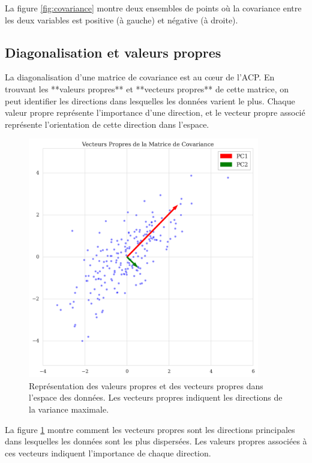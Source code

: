 \documentclass[a4paper,12pt]{report}
\begin{document}
La figure \ref{fig:covariance} montre deux ensembles de points où la covariance entre les deux variables est positive (à gauche) et négative (à droite).

\subsection{Diagonalisation et valeurs propres}

La diagonalisation d'une matrice de covariance est au cœur de l'ACP. En trouvant les **valeurs propres** et **vecteurs propres** de cette matrice, on peut identifier les directions dans lesquelles les données varient le plus. Chaque valeur propre représente l'importance d'une direction, et le vecteur propre associé représente l'orientation de cette direction dans l'espace.

\begin{figure}[H]
    \centering
    \includegraphics[width=0.9\textwidth]{eigenvec.png}
    \caption{Représentation des valeurs propres et des vecteurs propres dans l'espace des données. Les vecteurs propres indiquent les directions de la variance maximale.}
    \label{fig:valeurs_propres}
\end{figure}

La figure \ref{fig:valeurs_propres} montre comment les vecteurs propres sont les directions principales dans lesquelles les données sont les plus dispersées. Les valeurs propres associées à ces vecteurs indiquent l’importance de chaque direction.
\end{document}
